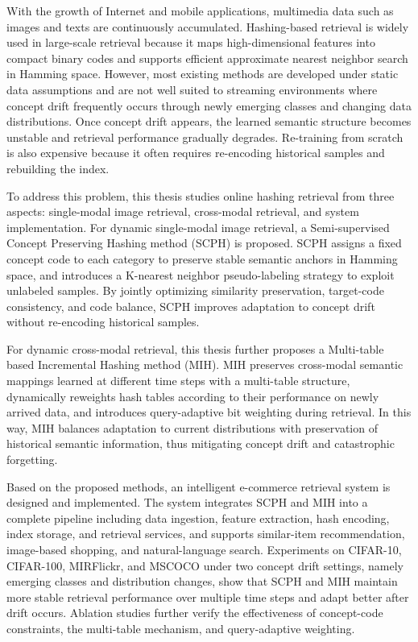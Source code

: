 \begin{eabstract}
With the growth of Internet and mobile applications, multimedia data such as images and texts are continuously accumulated. Hashing-based retrieval is widely used in large-scale retrieval because it maps high-dimensional features into compact binary codes and supports efficient approximate nearest neighbor search in Hamming space. However, most existing methods are developed under static data assumptions and are not well suited to streaming environments where concept drift frequently occurs through newly emerging classes and changing data distributions. Once concept drift appears, the learned semantic structure becomes unstable and retrieval performance gradually degrades. Re-training from scratch is also expensive because it often requires re-encoding historical samples and rebuilding the index.

To address this problem, this thesis studies online hashing retrieval from three aspects: single-modal image retrieval, cross-modal retrieval, and system implementation. For dynamic single-modal image retrieval, a Semi-supervised Concept Preserving Hashing method (SCPH) is proposed. SCPH assigns a fixed concept code to each category to preserve stable semantic anchors in Hamming space, and introduces a K-nearest neighbor pseudo-labeling strategy to exploit unlabeled samples. By jointly optimizing similarity preservation, target-code consistency, and code balance, SCPH improves adaptation to concept drift without re-encoding historical samples.

For dynamic cross-modal retrieval, this thesis further proposes a Multi-table based Incremental Hashing method (MIH). MIH preserves cross-modal semantic mappings learned at different time steps with a multi-table structure, dynamically reweights hash tables according to their performance on newly arrived data, and introduces query-adaptive bit weighting during retrieval. In this way, MIH balances adaptation to current distributions with preservation of historical semantic information, thus mitigating concept drift and catastrophic forgetting.

Based on the proposed methods, an intelligent e-commerce retrieval system is designed and implemented. The system integrates SCPH and MIH into a complete pipeline including data ingestion, feature extraction, hash encoding, index storage, and retrieval services, and supports similar-item recommendation, image-based shopping, and natural-language search. Experiments on CIFAR-10, CIFAR-100, MIRFlickr, and MSCOCO under two concept drift settings, namely emerging classes and distribution changes, show that SCPH and MIH maintain more stable retrieval performance over multiple time steps and adapt better after drift occurs. Ablation studies further verify the effectiveness of concept-code constraints, the multi-table mechanism, and query-adaptive weighting.


\end{eabstract}
